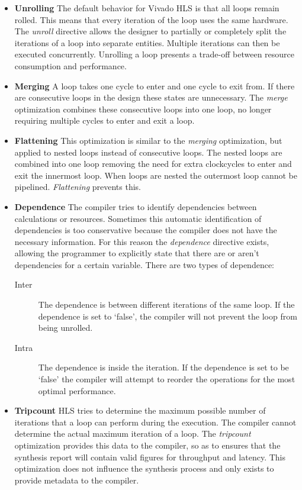\begin{itemize}

	\item 	\textbf{Unrolling} The default behavior for Vivado HLS is that all loops remain rolled. This means that every iteration of the loop uses the same hardware. The \emph{unroll} directive allows the designer to partially or completely split the iterations of a loop into separate entities. Multiple iterations can then be executed concurrently. Unrolling a loop presents a trade-off between resource consumption and performance. 

	\item 	\textbf{Merging} A loop takes one cycle to enter and one cycle to exit from. If there are consecutive loops in the design these states are unnecessary. The \emph{merge} optimization combines these consecutive loops into one loop, no longer requiring multiple cycles to enter and exit a loop.

	\item 	\textbf{Flattening} This optimization is similar to the \emph{merging} optimization, but applied to nested loops instead of consecutive loops. The nested loops are combined into one loop removing the need for extra clockcycles to enter and exit the innermost loop. When loops are nested the outermost loop cannot be pipelined. \emph{Flattening} prevents this.

	\item 	\textbf{Dependence} The compiler tries to identify dependencies between calculations or resources. Sometimes this automatic identification of dependencies is too conservative because the compiler does not have the necessary information. For this reason the \emph{dependence} directive exists, allowing the programmer to explicitly state that there are or aren't dependencies for a certain variable. There are two types of dependence:
	\begin{description}
		\item[Inter] The dependence is between different iterations of the same loop. If the dependence is set to `false', the compiler will not prevent the loop from being unrolled.
		\item[Intra] The dependence is inside the iteration. If the dependence is set to be `false' the compiler will attempt to reorder the operations for the most optimal performance.
	\end{description}

	\item 	\textbf{Tripcount} HLS tries to determine the maximum possible number of iterations that a loop can perform during the execution. The compiler cannot determine the actual maximum iteration of a loop. The \emph{tripcount} optimization provides this data to the compiler, so as to ensures that the synthesis report will contain valid figures for throughput and latency. This optimization does not influence the synthesis process and only exists to provide metadata to the compiler. 
\end{itemize}

